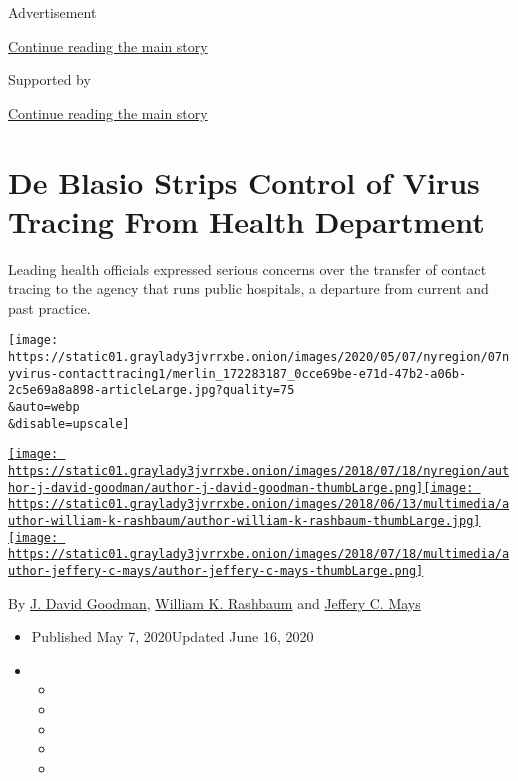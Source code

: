 Advertisement

\protect\hyperlink{after-top}{Continue reading the main story}

Supported by

\protect\hyperlink{after-sponsor}{Continue reading the main story}

\hypertarget{de-blasio-strips-control-of-virus-tracing-from-health-department}{%
\section{De Blasio Strips Control of Virus Tracing From Health
Department}\label{de-blasio-strips-control-of-virus-tracing-from-health-department}}

Leading health officials expressed serious concerns over the transfer of
contact tracing to the agency that runs public hospitals, a departure
from current and past practice.

\texttt{[image: https://static01.graylady3jvrrxbe.onion/images/2020/05/07/nyregion/07nyvirus-contacttracing1/merlin\_172283187\_0cce69be-e71d-47b2-a06b-2c5e69a8a898-articleLarge.jpg?quality=75\\\&auto=webp\\\&disable=upscale]}

\href{https://www.nytimes3xbfgragh.onion/by/j-david-goodman}{\texttt{[image: https://static01.graylady3jvrrxbe.onion/images/2018/07/18/nyregion/author-j-david-goodman/author-j-david-goodman-thumbLarge.png]}}\href{https://www.nytimes3xbfgragh.onion/by/william-k-rashbaum}{\texttt{[image: https://static01.graylady3jvrrxbe.onion/images/2018/06/13/multimedia/author-william-k-rashbaum/author-william-k-rashbaum-thumbLarge.jpg]}}\href{https://www.nytimes3xbfgragh.onion/by/jeffery-c-mays}{\texttt{[image: https://static01.graylady3jvrrxbe.onion/images/2018/07/18/multimedia/author-jeffery-c-mays/author-jeffery-c-mays-thumbLarge.png]}}

By \href{https://www.nytimes3xbfgragh.onion/by/j-david-goodman}{J. David
Goodman},
\href{https://www.nytimes3xbfgragh.onion/by/william-k-rashbaum}{William
K. Rashbaum} and
\href{https://www.nytimes3xbfgragh.onion/by/jeffery-c-mays}{Jeffery C.
Mays}

\begin{itemize}
\item
  Published May 7, 2020Updated June 16, 2020
\item
  \begin{itemize}
  \item
  \item
  \item
  \item
  \item
  \end{itemize}
\end{itemize}

